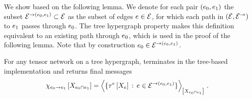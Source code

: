 We show  based on the following lemma.
We denote for each pair $(e_{0},e_{1})$ the subset $\mathcal{E}^{\rightarrow(e_{0},e_{1})}\subset\mathcal{E}$ as the subset of edges $e\in\mathcal{E}$, for which each path in $(\mathcal{E},\mathcal{E}^{\rightarrow})$ to $e_{1}$ passes through $e_{0}$. The tree hypergraph property makes this definition equivalent to an existing path through $e_{0}$, which is used in the proof of the following lemma.
Note that by construction $e_{0}\in\mathcal{E}^{\rightarrow(e_{0},e_{1})}$.

\begin{lemma}
    \label{lem:messageAsContraction}
    For any tensor network on a tree hypergraph,  terminates in the tree-based implementation and returns final messages
    \begin{align*}
        \chi_{e_{0} \rightarrow e_{1}}\left[X_{e_{0} \cap e_{1}}\right]
        = \left\langle \{\tau^{e}\left[X_{e}\right]\,:\,e\in\mathcal{E}^{\rightarrow(e_{0},e_{1})}\}\right\rangle_{\left[ X_{e_{0}\cap e_{1}} \right]}\,.
    \end{align*}
\end{lemma}
